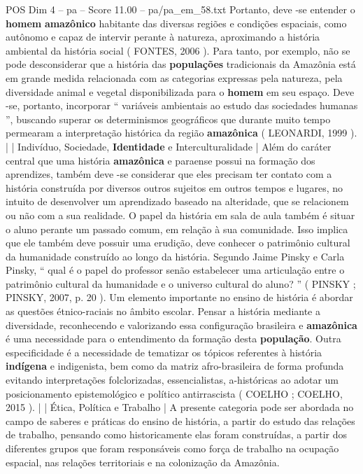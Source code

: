 \begin{textsample}{POS Dim 4 – pa – Score 11.00 – pa/pa\_em\_58.txt}
Portanto, deve -se entender o \textbf{homem} \textbf{amazônico} habitante das diversas regiões e condições espaciais, como autônomo e capaz de intervir perante à natureza, aproximando a história ambiental da história social ( FONTES, 2006 ).
Para tanto, por exemplo, não se pode desconsiderar que a história das \textbf{populações} tradicionais da Amazônia está em grande medida relacionada com as categorias expressas pela natureza, pela diversidade animal e vegetal disponibilizada para o \textbf{homem} em seu espaço.
Deve -se, portanto, incorporar “ variáveis ambientais ao estudo das sociedades humanas ”, buscando superar os determinismos geográficos que durante muito tempo permearam a interpretação histórica da região \textbf{amazônica} ( LEONARDI, 1999 ). | | Indivíduo, Sociedade, \textbf{Identidade} e Interculturalidade | Além do caráter central que uma história \textbf{amazônica} e paraense possui na formação dos aprendizes, também deve -se considerar que eles precisam ter contato com a história construída por diversos outros sujeitos em outros tempos e lugares, no intuito de desenvolver um aprendizado baseado na alteridade, que se relacionem ou não com a sua realidade.
O papel da história em sala de aula também é situar o aluno perante um passado comum, em relação à sua comunidade.
Isso implica que ele também deve possuir uma erudição, deve conhecer o patrimônio cultural da humanidade construído ao longo da história.
Segundo Jaime Pinsky e Carla Pinsky, “ qual é o papel do professor senão estabelecer uma articulação entre o patrimônio cultural da humanidade e o universo cultural do aluno? ” ( PINSKY ; PINSKY, 2007, p. 20 ).
Um elemento importante no ensino de história é abordar as questões étnico-raciais no âmbito escolar.
Pensar a história mediante a diversidade, reconhecendo e valorizando essa configuração brasileira e \textbf{amazônica} é uma necessidade para o entendimento da formação desta \textbf{população}.
Outra especificidade é a necessidade de tematizar os tópicos referentes à história \textbf{indígena} e indigenista, bem como da matriz afro-brasileira de forma profunda evitando interpretações folclorizadas, essencialistas, a-históricas ao adotar um posicionamento epistemológico e político antirrascista ( COELHO ; COELHO, 2015 ). | | Ética, Política e Trabalho | A presente categoria pode ser abordada no campo de saberes e práticas do ensino de história, a partir do estudo das relações de trabalho, pensando como historicamente elas foram construídas, a partir dos diferentes grupos que foram responsáveis como força de trabalho na ocupação espacial, nas relações territoriais e na colonização da Amazônia.

\end{textsample}
